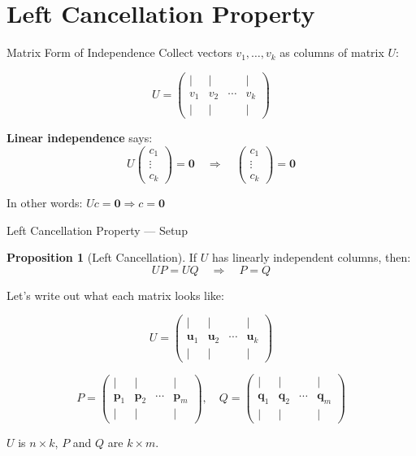 \documentclass[10pt]{beamer}
\theoremstyle{definition}
\newtheorem{prop}{Proposition}[section]
\newcommand{\x}[1]{\alert{\textbf{#1}}}
\begin{document}
\section{Left Cancellation Property}

\begin{frame}{Matrix Form of Independence}
Collect vectors $v_1, \ldots, v_k$ as columns of matrix $U$:

$$U = \begin{pmatrix} | & | & & | \\ v_1 & v_2 & \cdots & v_k \\ | & | & & | \end{pmatrix}$$

\vfill
\x{Linear independence} says:
$$U\begin{pmatrix} c_1 \\ \vdots \\ c_k \end{pmatrix} = \mathbf{0} \quad \Rightarrow \quad \begin{pmatrix} c_1 \\ \vdots \\ c_k \end{pmatrix} = \mathbf{0}$$

In other words: $Uc = \mathbf{0} \Rightarrow c = \mathbf{0}$
\end{frame}

\begin{frame}{Left Cancellation Property — Setup}
\begin{prop}[Left Cancellation]
If $U$ has linearly independent columns, then:
$$UP = UQ \quad \Rightarrow \quad P = Q$$
\end{prop}

\vfill
Let's write out what each matrix looks like:

$$U = \begin{pmatrix} | & | & & | \\ \mathbf{u}_1 & \mathbf{u}_2 & \cdots & \mathbf{u}_k \\ | & | & & | \end{pmatrix}$$

$$P = \begin{pmatrix} | & | & & | \\ \mathbf{p}_1 & \mathbf{p}_2 & \cdots & \mathbf{p}_m \\ | & | & & | \end{pmatrix}, \quad Q = \begin{pmatrix} | & | & & | \\ \mathbf{q}_1 & \mathbf{q}_2 & \cdots & \mathbf{q}_m \\ | & | & & | \end{pmatrix}$$

\vfill
$U$ is $n \times k$, $P$ and $Q$ are $k \times m$.
\end{frame}
\end{document}
